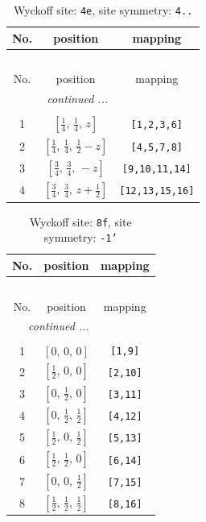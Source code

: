 \documentclass[fleqn,8pt]{jsarticle}
\begin{document}
\renewcommand{\arraystretch}{1.2}
\begin{longtable}{ccc}
\caption{Wyckoff site: {\tt 4e}, site symmetry: {\tt 4..}}
 \\
 \hline \hline
No. & position & mapping \\ \hline \endfirsthead

\multicolumn{2}{l}{\tablename\ \thetable{}} \\
 \hline \hline
No. & position & mapping \\ \hline \endhead

 \hline \hline
\multicolumn{2}{r}{\footnotesize\it continued ...} \\ \endfoot

 \hline \hline
\multicolumn{2}{r}{} \\ \endlastfoot

1 & $\left[ \frac{1}{4},\, \frac{1}{4},\, z \right]$ & {\tt [1,2,3,6]} \\ \hline
2 & $\left[ \frac{1}{4},\, \frac{1}{4},\, \frac{1}{2} - z \right]$ & {\tt [4,5,7,8]} \\ \hline
3 & $\left[ \frac{3}{4},\, \frac{3}{4},\, - z \right]$ & {\tt [9,10,11,14]} \\ \hline
4 & $\left[ \frac{3}{4},\, \frac{3}{4},\, z + \frac{1}{2} \right]$ & {\tt [12,13,15,16]} \\
\end{longtable}
\renewcommand{\arraystretch}{1.2}
\begin{longtable}{ccc}
\caption{Wyckoff site: {\tt 8f}, site symmetry: {\tt -1'}}
 \\
 \hline \hline
No. & position & mapping \\ \hline \endfirsthead

\multicolumn{2}{l}{\tablename\ \thetable{}} \\
 \hline \hline
No. & position & mapping \\ \hline \endhead

 \hline \hline
\multicolumn{2}{r}{\footnotesize\it continued ...} \\ \endfoot

 \hline \hline
\multicolumn{2}{r}{} \\ \endlastfoot

1 & $\left[ 0,\, 0,\, 0 \right]$ & {\tt [1,9]} \\ \hline
2 & $\left[ \frac{1}{2},\, 0,\, 0 \right]$ & {\tt [2,10]} \\ \hline
3 & $\left[ 0,\, \frac{1}{2},\, 0 \right]$ & {\tt [3,11]} \\ \hline
4 & $\left[ 0,\, \frac{1}{2},\, \frac{1}{2} \right]$ & {\tt [4,12]} \\ \hline
5 & $\left[ \frac{1}{2},\, 0,\, \frac{1}{2} \right]$ & {\tt [5,13]} \\ \hline
6 & $\left[ \frac{1}{2},\, \frac{1}{2},\, 0 \right]$ & {\tt [6,14]} \\ \hline
7 & $\left[ 0,\, 0,\, \frac{1}{2} \right]$ & {\tt [7,15]} \\ \hline
8 & $\left[ \frac{1}{2},\, \frac{1}{2},\, \frac{1}{2} \right]$ & {\tt [8,16]} \\
\end{longtable}
\end{document}
